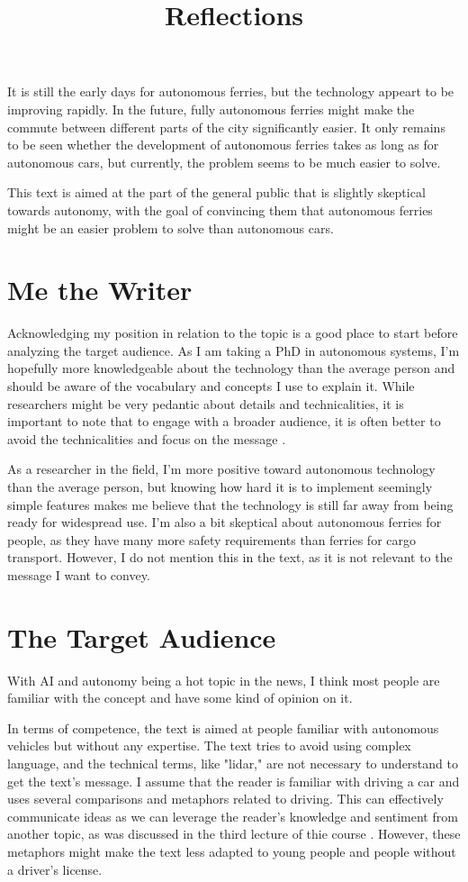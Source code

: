 \documentclass{iopconfser}
\begin{document}
It is still the early days for autonomous ferries, but the technology appeart to be improving rapidly.
In the future, fully autonomous ferries might make the commute between different parts of the city significantly easier.
It only remains to be seen whether the development of autonomous ferries takes as long as for autonomous cars, but currently, the problem seems to be much easier to solve.


\newpage
\title{Reflections}
This text is aimed at the part of the general public that is slightly skeptical towards autonomy, with the goal of convincing them that autonomous ferries might be an easier problem to solve than autonomous cars.

\section*{Me the Writer}
Acknowledging my position in relation to the topic is a good place to start before analyzing the target audience.
As I am taking a PhD in autonomous systems, I'm hopefully more knowledgeable about the technology than the average person and should be aware of the vocabulary and concepts I use to explain it.
While researchers might be very pedantic about details and technicalities, it is important to note that to engage with a broader audience, it is often better to avoid the technicalities and focus on the message \cite{kulykPeopleWantReassurance2023}.

As a researcher in the field, I'm more positive toward autonomous technology than the average person, but knowing how hard it is to implement seemingly simple features makes me believe that the technology is still far away from being ready for widespread use.
I'm also a bit skeptical about autonomous ferries for people, as they have many more safety requirements than ferries for cargo transport.
However, I do not mention this in the text, as it is not relevant to the message I want to convey.

\section*{The Target Audience}
With AI and autonomy being a hot topic in the news, I think most people are familiar with the concept and have some kind of opinion on it.

In terms of competence, the text is aimed at people familiar with autonomous vehicles but without any expertise.
The text tries to avoid using complex language, and the technical terms, like "lidar," are not necessary to understand to get the text's message.
I assume that the reader is familiar with driving a car and uses several comparisons and metaphors related to driving.
This can effectively communicate ideas as we can leverage the reader's knowledge and sentiment from another topic, as was discussed in the third lecture of thie course \cite{gustafssonCognitiveLinguisticsScience2024}.
However, these metaphors might make the text less adapted to young people and people without a driver's license.
\end{document}
